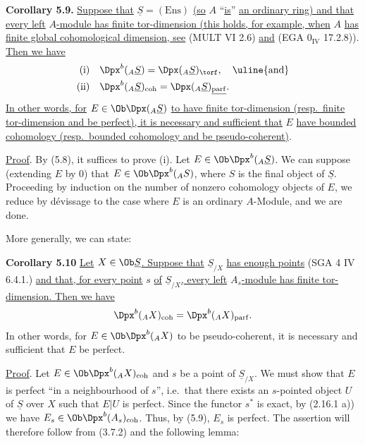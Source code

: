 \textbf{Corollary 5.9.} \uline{Suppose that} \(\underline{S}=(\mathrm{Ens})\) \uline{(so} \(A\) ``\uline{is}'' \uline{an ordinary ring) and that every left} \(A\)\uline{-module has finite tor-dimension (this holds, for example, when} \(A\) \uline{has finite global cohomological dimension, see} (MULT VI 2.6) \uline{and} (EGA \(0_{\mathrm{IV}}\) 17.2.8)). \uline{Then we have}
\[
\begin{aligned}
\text{(i)}\quad & \Dpx^b({}_A \underline{S})=\Dpx({}_A \underline{S})_{\torf},\quad\text{\uline{and}}\\
\text{(ii)}\quad & \Dpx^b({}_A \underline{S})_{\mathrm{coh}}=\Dpx({}_A \underline{S})_{\underline{\mathrm{parf}}}.
\end{aligned}
\]
\uline{In other words, for} \(E\in\Ob\Dpx({}_A \underline{S})\) \uline{to have finite tor-dimension (resp.\ finite tor-dimension and be perfect), it is necessary and sufficient that} \(E\) \uline{have bounded cohomology (resp.\ bounded cohomology and be pseudo-coherent)}.

\uline{Proof}. By (5.8), it suffices to prove (i). Let \(E\in\Ob\Dpx^b({}_A \underline{S})\). We can suppose (extending \(E\) by \(0\)) that \(E\in\Ob\Dpx^b({}_A S)\), where \(S\) is the final object of \(\underline{S}\). Proceeding by induction on the number of nonzero cohomology objects of \(E\), we reduce by dévissage to the case where \(E\) is an ordinary \(A\)-Module, and we are done.

More generally, we can state:

\textbf{Corollary 5.10} \uline{Let} \(X\in\Ob \underline{S}\)\uline{. Suppose that} \(\underline{S}_{/X}\) \uline{has enough points} (SGA 4 IV 6.4.1.) \uline{and that, for every point} \(s\) \uline{of} \(\underline{S}_{/X}\)\uline{, every left} \(A_s\)\uline{-module has finite tor-dimension. Then we have}
\[
  \Dpx^b({}_A X)_{\mathrm{coh}}=\Dpx^b({}_A X)_{\mathrm{parf}}.
\]
%
In other words, for \(E\in\Ob\Dpx^b({}_A X)\) to be pseudo-coherent, it is necessary and sufficient that \(E\) be perfect.

\uline{Proof}. Let \(E\in\Ob\Dpx^b({}_A X)_{\mathrm{coh}}\) and \(s\) be a point of \(\underline{S}_{/X}\). We must show that \(E\) is perfect ``in a neighbourhood of \(s\)'', i.e.\ that there exists an \(s\)-pointed object \(U\) of \(\underline{S}\) over \(X\) such that \(E|U\) is perfect. Since the functor \(s^*\) is exact, by (2.16.1 a)) we have \(E_s\in\Ob\Dpx^b(A_s)_{\mathrm{coh}}\). Thus, by (5.9), \(E_s\) is perfect. The assertion will therefore follow from (3.7.2) and the following lemma:

